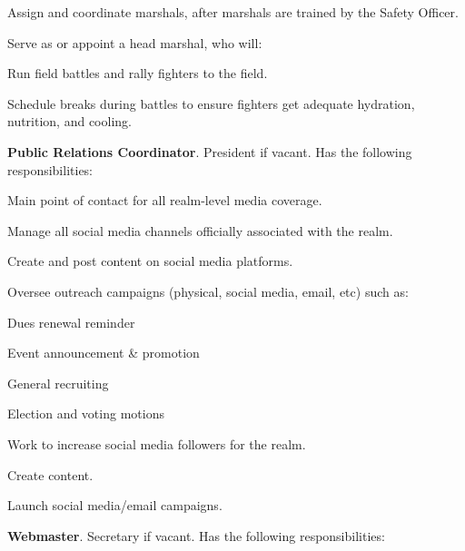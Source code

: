 \documentclass[12pt]{article}
\begin{document}
\begin{level}
\begin{level}
\begin{level}
        \item Assign and coordinate marshals, after marshals are trained by the Safety Officer.
        \item Serve as or appoint a head marshal, who will:
        \begin{level}
            \item Run field battles and rally fighters to the field.
            \item Schedule breaks during battles to ensure fighters get adequate hydration, nutrition, and cooling.
        \end{level}
    \end{level}
    \item \textbf{Public Relations Coordinator}. President if vacant. Has the following responsibilities:
    \begin{level}
        \item Main point of contact for all realm-level media coverage.
        \item {}
        \item Manage all social media channels officially associated with the realm.
        \item Create and post content on social media platforms.
        \item Oversee outreach campaigns (physical, social media, email, etc) such as:
        \begin{level}
            \item Dues renewal reminder
            \item Event announcement \& promotion
            \item General recruiting
            \item Election and voting motions
        \end{level}
        \item Work to increase social media followers for the realm.
        \item {}
        \begin{level}
            \item Create content.
            \item Launch social media/email campaigns.
        \end{level}
    \end{level}
    \item \textbf{Webmaster}. Secretary if vacant. Has the following responsibilities:

\end{level}
\end{level}
\end{document}

